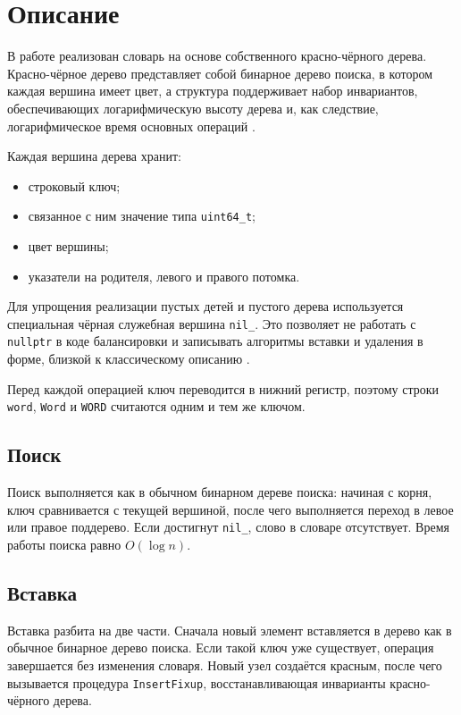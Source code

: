 \section{Описание}

В работе реализован словарь на основе собственного красно-чёрного дерева. Красно-чёрное дерево представляет собой бинарное дерево поиска, в котором каждая вершина имеет цвет, а структура поддерживает набор инвариантов, обеспечивающих логарифмическую высоту дерева и, как следствие, логарифмическое время основных операций \cite{Kormen3}.

Каждая вершина дерева хранит:
\begin{itemize}
\item строковый ключ;
\item связанное с ним значение типа \texttt{uint64\_t};
\item цвет вершины;
\item указатели на родителя, левого и правого потомка.
\end{itemize}

Для упрощения реализации пустых детей и пустого дерева используется специальная чёрная служебная вершина \texttt{nil\_}. Это позволяет не работать с \texttt{nullptr} в коде балансировки и записывать алгоритмы вставки и удаления в форме, близкой к классическому описанию \cite{Kormen3, Knuth3}.

Перед каждой операцией ключ переводится в нижний регистр, поэтому строки \texttt{word}, \texttt{Word} и \texttt{WORD} считаются одним и тем же ключом.

\subsection{Поиск}

Поиск выполняется как в обычном бинарном дереве поиска: начиная с корня, ключ сравнивается с текущей вершиной, после чего выполняется переход в левое или правое поддерево. Если достигнут \texttt{nil\_}, слово в словаре отсутствует. Время работы поиска равно $O(\log n)$.

\subsection{Вставка}

Вставка разбита на две части. Сначала новый элемент вставляется в дерево как в обычное бинарное дерево поиска. Если такой ключ уже существует, операция завершается без изменения словаря. Новый узел создаётся красным, после чего вызывается процедура \texttt{InsertFixup}, восстанавливающая инварианты красно-чёрного дерева.

